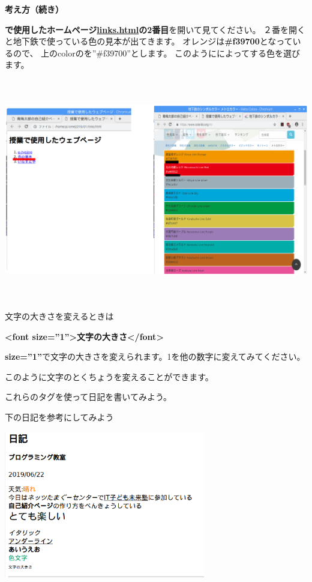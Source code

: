 \documentclass[a4paper,12pt]{jarticle}
\begin{document}
\bigskip



\clearpage
\textbf{考え方（続き）}



\textbf{で使用したホームページ\url{links.html}の2番目}を開いて見てください。
２番を開くと地下鉄で使っている色の見本が出てきます。
オレンジは\textbf{\#f39700}となっているので、
上のcolorのを”\#f39700”とします。
このようにによってする色を選びます。



\bigskip

\includegraphics[width=16.39cm,height=9.698cm]{textbook-img187.png}

文字の大きさを変えるときは

\textbf{{\textless}font size=”1”{\textgreater}文字の大きさ{\textless}/font{\textgreater}}

\textbf{size=”1”}で文字の大きさを変えられます。1を他の数字に変えてみてください。

このように文字のとくちょうを変えることができます。


\bigskip

これらのタグを使って日記を書いてみよう。

下の日記を参考にしてみよう


\bigskip

\includegraphics[width=8.779cm,height=6.412cm]{textbook-img185.png}
\end{document}
